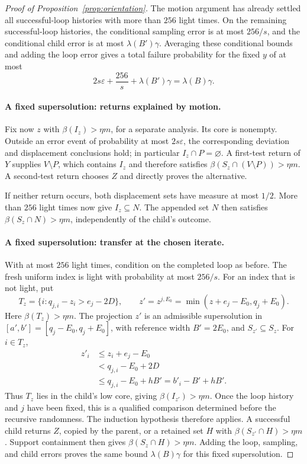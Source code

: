 \begin{proof}[Proof of Proposition~\ref{prop:orientation}]
The motion argument has already settled all successful-loop histories
with more than \(256\) light times. On the remaining successful-loop
histories, the conditional sampling error is at most \(256/s\), and
the conditional child error is at most \(\lambda(B')\gamma\).
Averaging these conditional bounds and adding the loop error gives
a total failure probability for the fixed \(y\) of at most
\[
  2s\varepsilon+\frac{256}{s}+\lambda(B')\gamma
  =\lambda(B)\gamma.
\]

\paragraph{A fixed supersolution: returns explained by motion.}
Fix now \(z\) with \(\beta(I_z)>\eta m\), for a separate analysis.
Its core is nonempty. Outside an error event of probability at most
\(2s\varepsilon\), the corresponding deviation and displacement
conclusions hold; in particular \(I_z\cap P=\varnothing\).
A first-test return of \(Y\) supplies \(V\setminus P\), which
contains \(I_z\) and therefore satisfies
\(\beta(S_z\cap(V\setminus P))>\eta m\).
A second-test return chooses \(Z\) and directly proves the alternative.

If neither return occurs, both displacement sets have measure at most
\(1/2\). More than \(256\) light times now give \(I_z\subseteq N\).
The appended set \(N\) then satisfies
\(\beta(S_z\cap N)>\eta m\), independently of the child's outcome.

\paragraph{A fixed supersolution: transfer at the chosen iterate.}
With at most \(256\) light times, condition on the completed loop as
before. The fresh uniform index is light with probability at most
\(256/s\). For an index that is not light, put
\[
  T_z=\{i:q_{j,i}-z_i>e_j-2D\},
  \qquad
  z'=z^{j,E_0}=\min(z+e_j-E_0,q_j+E_0).
\]
Here \(\beta(T_z)>\eta m\). The projection \(z'\) is an admissible
supersolution in \([a',b']=[q_j-E_0,q_j+E_0]\), with reference width
\(B'=2E_0\), and \(S_{z'}\subseteq S_z\). For \(i\in T_z\),
\begin{align*}
  z'_i
  &\leq z_i+e_j-E_0\\
  &<q_{j,i}-E_0+2D\\
  &\leq q_{j,i}-E_0+hB'
   =b'_i-B'+hB'.
\end{align*}
Thus \(T_z\) lies in the child's low core, giving
\(\beta(I_{z'})>\eta m\). Once the loop history and \(j\) have
been fixed, this is a qualified comparison determined before the
recursive randomness. The induction hypothesis therefore applies.
A successful child returns \(Z\), copied by the parent, or a retained
set \(H\) with \(\beta(S_{z'}\cap H)>\eta m\). Support containment
then gives \(\beta(S_z\cap H)>\eta m\). Adding the loop, sampling,
and child errors proves the same bound \(\lambda(B)\gamma\) for
this fixed supersolution.


\end{proof}
